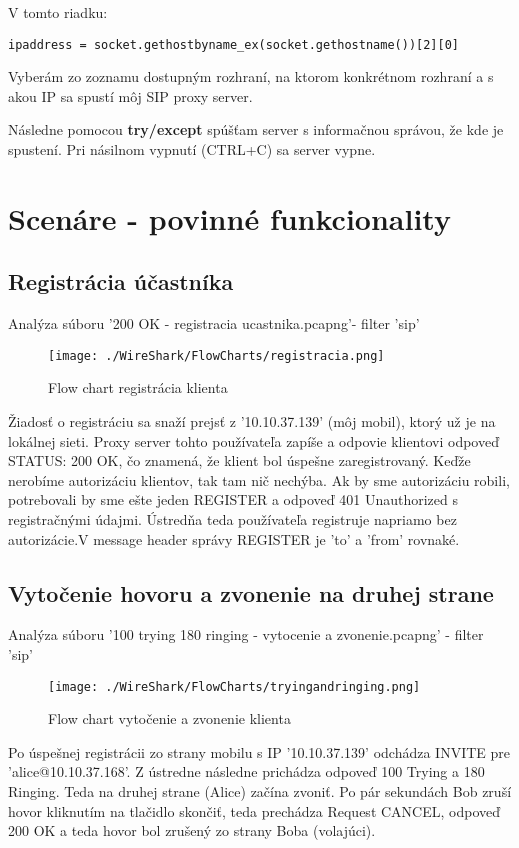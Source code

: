 \documentclass[10pt,oneside,slovak,a4paper]{article}
\begin{document}
V tomto riadku:
\begin{lstlisting}
ipaddress = socket.gethostbyname_ex(socket.gethostname())[2][0]
\end{lstlisting}
Vyberám zo zoznamu dostupným rozhraní, na ktorom konkrétnom rozhraní a s akou IP sa spustí môj SIP proxy server.

Následne pomocou \textbf{try/except} spúšťam server s informačnou správou, že kde je spustení. Pri násilnom vypnutí (CTRL+C) sa server vypne.

\newpage
\section{Scenáre - povinné funkcionality}

\subsection{Registrácia účastníka}

Analýza súboru '200 OK - registracia ucastnika.pcapng'- filter 'sip'
\begin{figure}[h]
\centerline{\texttt{[image: ./WireShark/FlowCharts/registracia.png]}} 
\caption{Flow chart registrácia klienta}
\end{figure}

Žiadosť o registráciu sa snaží prejsť z '10.10.37.139' (môj mobil), ktorý už je na lokálnej sieti. Proxy server tohto používateľa zapíše a odpovie klientovi odpoveď STATUS: 200 OK, čo znamená, že klient bol úspešne zaregistrovaný. Keďže nerobíme autorizáciu klientov, tak tam nič nechýba. Ak by sme autorizáciu robili, potrebovali by sme ešte jeden REGISTER a odpoveď 401 Unauthorized s registračnými údajmi. Ústredňa teda používateľa registruje napriamo bez autorizácie.V message header správy REGISTER je 'to' a 'from' rovnaké.

\subsection{Vytočenie hovoru a zvonenie na druhej strane}
Analýza súboru '100 trying 180 ringing - vytocenie a zvonenie.pcapng' - filter 'sip'
\begin{figure}[h]
\centerline{\texttt{[image: ./WireShark/FlowCharts/tryingandringing.png]}} 
\caption{Flow chart vytočenie a zvonenie klienta}
\end{figure}

Po úspešnej registrácii zo strany mobilu s IP '10.10.37.139' odchádza INVITE pre 'alice@10.10.37.168'. Z ústredne následne prichádza odpoveď 100 Trying a 180 Ringing. Teda na druhej strane (Alice) začína zvoniť.
Po pár sekundách Bob zruší hovor kliknutím na tlačidlo skončiť, teda prechádza Request CANCEL, odpoveď 200 OK a teda hovor bol zrušený zo strany Boba (volajúci).  
\end{document}
